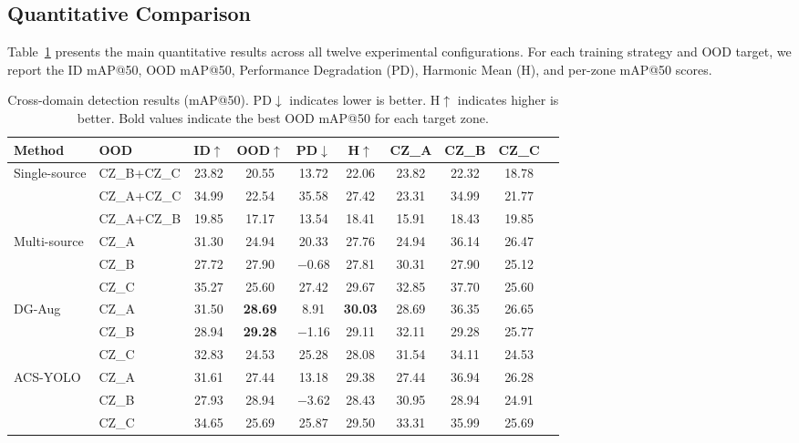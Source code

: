 \documentclass[12pt,a4paper]{article}
\begin{document}
\subsection{Quantitative Comparison}

Table~\ref{tab:main_results_50} presents the main quantitative results across all twelve experimental configurations. For each training strategy and OOD target, we report the ID mAP@50, OOD mAP@50, Performance Degradation (PD), Harmonic Mean (H), and per-zone mAP@50 scores.

\begin{table}[H]
\centering
\caption{Cross-domain detection results (mAP@50). PD$\downarrow$ indicates lower is better. H$\uparrow$ indicates higher is better. Bold values indicate the best OOD mAP@50 for each target zone.}
\label{tab:main_results_50}
\small
\begin{tabular}{llcccccccc}
\toprule
\textbf{Method} & \textbf{OOD} & \textbf{ID$\uparrow$} & \textbf{OOD$\uparrow$} & \textbf{PD$\downarrow$} & \textbf{H$\uparrow$} & \textbf{CZ\_A} & \textbf{CZ\_B} & \textbf{CZ\_C} \\
\midrule
\multirow{3}{*}{Single-source}
 & CZ\_B+CZ\_C & 23.82 & 20.55 & 13.72 & 22.06 & 23.82 & 22.32 & 18.78 \\
 & CZ\_A+CZ\_C & 34.99 & 22.54 & 35.58 & 27.42 & 23.31 & 34.99 & 21.77 \\
 & CZ\_A+CZ\_B & 19.85 & 17.17 & 13.54 & 18.41 & 15.91 & 18.43 & 19.85 \\
\midrule
\multirow{3}{*}{Multi-source}
 & CZ\_A & 31.30 & 24.94 & 20.33 & 27.76 & 24.94 & 36.14 & 26.47 \\
 & CZ\_B & 27.72 & 27.90 &  $-$0.68 & 27.81 & 30.31 & 27.90 & 25.12 \\
 & CZ\_C & 35.27 & 25.60 & 27.42 & 29.67 & 32.85 & 37.70 & 25.60 \\
\midrule
\multirow{3}{*}{DG-Aug}
 & CZ\_A & 31.50 & \textbf{28.69} &  8.91 & \textbf{30.03} & 28.69 & 36.35 & 26.65 \\
 & CZ\_B & 28.94 & \textbf{29.28} & $-$1.16 & 29.11 & 32.11 & 29.28 & 25.77 \\
 & CZ\_C & 32.83 & 24.53 & 25.28 & 28.08 & 31.54 & 34.11 & 24.53 \\
\midrule
\multirow{3}{*}{ACS-YOLO}
 & CZ\_A & 31.61 & 27.44 & 13.18 & 29.38 & 27.44 & 36.94 & 26.28 \\
 & CZ\_B & 27.93 & 28.94 & $-$3.62 & 28.43 & 30.95 & 28.94 & 24.91 \\
 & CZ\_C & 34.65 & 25.69 & 25.87 & 29.50 & 33.31 & 35.99 & 25.69 \\
\bottomrule
\end{tabular}
\end{table}
\end{document}
